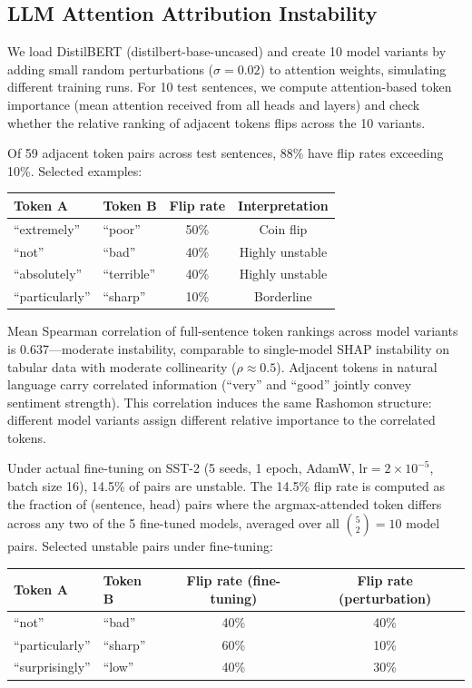 \documentclass{article}
\begin{document}
\subsection{LLM Attention Attribution Instability}

We load DistilBERT (distilbert-base-uncased) and create 10 model variants by adding small random perturbations ($\sigma = 0.02$) to attention weights, simulating different training runs. For 10 test sentences, we compute attention-based token importance (mean attention received from all heads and layers) and check whether the relative ranking of adjacent tokens flips across the 10 variants.

Of 59 adjacent token pairs across test sentences, 88\% have flip rates exceeding 10\%. Selected examples:

\begin{center}
\small
\begin{tabular}{@{}llcc@{}}
\toprule
Token A & Token B & Flip rate & Interpretation \\
\midrule
``extremely'' & ``poor'' & 50\% & Coin flip \\
``not'' & ``bad'' & 40\% & Highly unstable \\
``absolutely'' & ``terrible'' & 40\% & Highly unstable \\
``particularly'' & ``sharp'' & 10\% & Borderline \\
\bottomrule
\end{tabular}
\end{center}

Mean Spearman correlation of full-sentence token rankings across model variants is 0.637---moderate instability, comparable to single-model SHAP instability on tabular data with moderate collinearity ($\rho \approx 0.5$). Adjacent tokens in natural language carry correlated information (``very'' and ``good'' jointly convey sentiment strength). This correlation induces the same Rashomon structure: different model variants assign different relative importance to the correlated tokens.

Under actual fine-tuning on SST-2 (5 seeds, 1 epoch, AdamW, lr$=2{\times}10^{-5}$, batch size 16), 14.5\% of pairs are unstable. The 14.5\% flip rate is computed as the fraction of (sentence, head) pairs where the argmax-attended token differs across any two of the 5 fine-tuned models, averaged over all $\binom{5}{2}=10$ model pairs. Selected unstable pairs under fine-tuning:

\begin{center}
\small
\begin{tabular}{@{}llcc@{}}
\toprule
Token A & Token B & Flip rate (fine-tuning) & Flip rate (perturbation) \\
\midrule
``not'' & ``bad'' & 40\% & 40\% \\
``particularly'' & ``sharp'' & 60\% & 10\% \\
``surprisingly'' & ``low'' & 40\% & 30\% \\
\bottomrule
\end{tabular}
\end{center}
\end{document}
